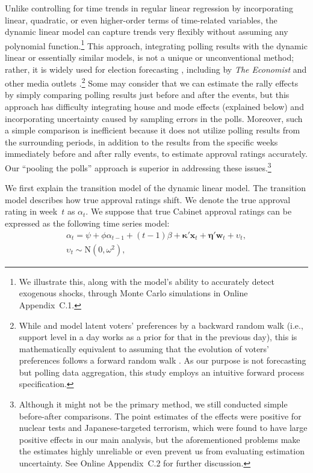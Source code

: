 \documentclass[letterpaper,12pt]{scrartcl}
\begin{document}
Unlike controlling for time trends in regular linear regression by incorporating linear, quadratic, or even higher-order terms of time-related variables, the dynamic linear model can capture trends very flexibly without assuming any polynomial function.\footnote{We illustrate this, along with the model's ability to accurately detect exogenous shocks, through Monte Carlo simulations in Online Appendix~C.1.} This approach, integrating polling results with the dynamic linear or essentially similar models, is not a unique or unconventional method; rather, it is widely used for election forecasting \citep[e.g.,][]{Fisher2011ElectStud,Linzer2013JASA,Stoetzer2019PA,Walther2015ES}, including by \emph{The Economist} and other media outlets \citep{Heidemanns2020HarvardDataSciRev,Pasek2015POQ}.\footnote{While \citet{Linzer2013JASA} and \citet{Stoetzer2019PA} model latent voters' preferences by a backward random walk (i.e., support level in a day works as a prior for that in the previous day), this is mathematically equivalent to assuming that the evolution of voters' preferences follows a forward random walk \citep[Footnote~6]{Stoetzer2019PA}. As our purpose is not forecasting but polling data aggregation, this study employs an intuitive forward process specification.} Some may consider that we can estimate the rally effects by simply comparing polling results just before and after the events, but this approach has difficulty integrating house and mode effects (explained below) and incorporating uncertainty caused by sampling errors in the polls. Moreover, such a simple comparison is inefficient because it does not utilize polling results from the surrounding periods, in addition to the results from the specific weeks immediately before and after rally events, to estimate approval ratings accurately. Our ``pooling the polls'' approach is superior in addressing these issues.\footnote{Although it might not be the primary method, we still conducted simple before-after comparisons. The point estimates of the effects were positive for nuclear tests and Japanese-targeted terrorism, which were found to have large positive effects in our main analysis, but the aforementioned problems make the estimates highly unreliable or even prevent us from evaluating estimation uncertainty. See Online Appendix~C.2 for further discussion.}

We first explain the transition model of the dynamic linear model. The transition model describes how true approval ratings shift. We denote the true approval rating in week~$t$ as $\alpha _{t}$. We suppose that true Cabinet approval ratings can be expressed as the following time series model:
\begin{gather}
\alpha _{t}=\psi + \phi \alpha _{t-1}+(t-1)\beta +\bm{\kappa}'\bm{x}_{t}+\bm{\eta}'\bm{w}_{t}+\upsilon _{t},\label{transition_model}\\
\upsilon _{t}\sim \mathrm{N}(0,\omega ^{2}),
\end{gather}
\end{document}
